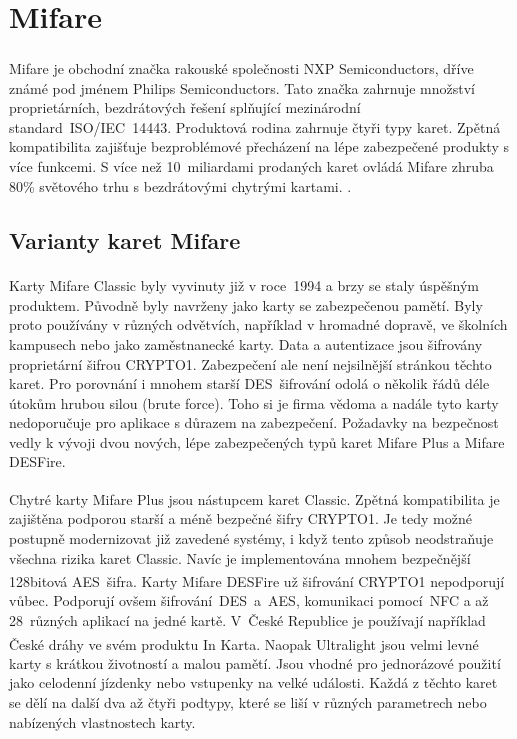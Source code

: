 \section{Mifare\textsuperscript{\textregistered}}
Mifare\textsuperscript{\textregistered} je obchodní značka rakouské společnosti NXP Semiconductors, dříve známé pod jménem Philips Semiconductors. Tato značka zahrnuje množství proprietárních, bezdrátových řešení splňující mezinárodní standard~ISO/IEC~14443. Produktová rodina zahrnuje čtyři typy karet. Zpětná kompatibilita zajišťuje bezproblémové přecházení na lépe zabezpečené produkty s více funkcemi. S více než 10~miliardami prodaných karet ovládá Mifare zhruba 80\% světového trhu s bezdrátovými chytrými kartami. 
\cite{About_Mifare}\cite{Dismantling_Mifare_Classic}.

\subsection{Varianty karet Mifare}

Karty Mifare Classic\textsuperscript{\textregistered} byly vyvinuty již v roce~1994 a brzy se staly úspěšným produktem. Původně byly navrženy jako karty se zabezpečenou pamětí. Byly proto používány v různých odvětvích, například v hromadné dopravě, ve školních kampusech nebo jako zaměstnanecké karty. Data a autentizace jsou šifrovány proprietární šifrou CRYPTO1. Zabezpečení ale není nejsilnější stránkou těchto karet. Pro porovnání i mnohem starší DES~šifrování odolá o několik řádů déle útokům hrubou silou (brute force). Toho si je firma vědoma a nadále tyto karty nedoporučuje pro aplikace s důrazem na zabezpečení. Požadavky na bezpečnost vedly k vývoji dvou nových, lépe zabezpečených typů karet Mifare Plus a Mifare DESFire\cite{Mifare_Classic_story}\cite{Mifare_Classic_Official_about}. 
\par
Chytré karty Mifare Plus\textsuperscript{\textregistered} jsou nástupcem karet Classic. Zpětná kompatibilita je zajištěna podporou starší a méně bezpečné šifry CRYPTO1. Je tedy možné postupně modernizovat již zavedené systémy, i když tento způsob neodstraňuje všechna rizika karet Classic. Navíc je implementována mnohem bezpečnější 128bitová AES~šifra\cite{Mifare_Plus_Official}. Karty Mifare DESFire\textsuperscript{\textregistered} už šifrování CRYPTO1 nepodporují vůbec. Podporují ovšem šifrování~DES~a~AES, komunikaci pomocí~NFC a až 28~různých aplikací na jedné kartě\cite{Mifare_DESFire_Official}. V~České Republice je používají například České dráhy ve svém produktu In Karta\cite{Ceske_Drahy_Podminky_InKarta}. Naopak Ultralight\textsuperscript{\textregistered} jsou velmi levné karty s krátkou životností a malou pamětí. Jsou vhodné pro jednorázové použití jako celodenní jízdenky nebo vstupenky na velké události\cite{Mifare_Ultralight_Official}. Každá z těchto karet se dělí na další dva až čtyři podtypy, které se liší v různých parametrech nebo nabízených vlastnostech karty.

